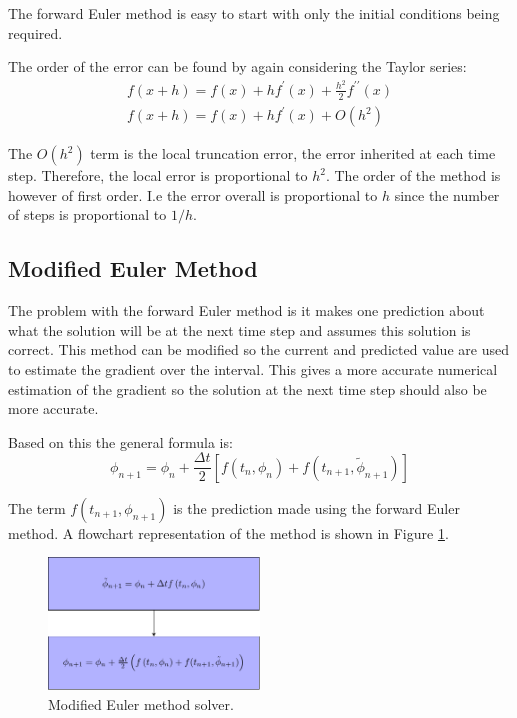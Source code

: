 \documentclass[../Interim_Report_Master]{subfiles}
\begin{document}
The forward Euler method is easy to start with only the initial conditions being required.

The order of the error can be found by again considering the Taylor series:
\begin{subequations}
\begin{eqnarray}
f(x+h) = f(x)+hf^\prime(x)+\frac{h^2}{2}f^{\prime\prime}(x) \\
f(x+h) = f(x)+hf^\prime(x)+O(h^2)
\end{eqnarray}
\end{subequations}

The $O(h^2)$ term is the local truncation error, the error inherited at each time step. Therefore, the local error is proportional to $h^2$. The order of the method is however of first order. I.e the error overall is proportional to $h$ since the number of steps is proportional to $1/h$. 

\subsection{Modified Euler Method}
The problem with the forward Euler method is it makes one prediction about what the solution will be at the next time step and assumes this solution is correct. This method can be modified so the current and predicted value are used to estimate the gradient over the interval. This gives a more accurate numerical estimation of the gradient so the solution at the next time step should also be more accurate. 

Based on this the general formula is:
\begin{equation}
\phi_{n+1} = \phi_n+\frac{\Delta t}{2}\left[f(t_n,\phi_n)+f(t_{n+1},\tilde{\phi}_{n+1})\right]
\end{equation}

The term $f(t_{n+1},\phi_{n+1})$ is the prediction made using the forward Euler method. A flowchart representation of the method is shown in Figure \ref{mod_euler}. 
\begin{figure}
	\centering
	\includegraphics[width=0.5\textwidth]{./Diagrams/Modified_Euler_Method_Flowchart/Modified_Euler_Method_Flowchart.pdf}
	\caption{Modified Euler method solver.}
	\label{mod_euler}
\end{figure}
\end{document}

